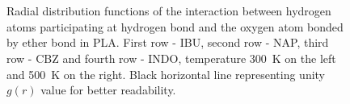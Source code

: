 \begin{figure}[H]
	\\
	\vspace{-0.2cm}
	\\
	\vspace{-0.2cm}
	\caption{Radial distribution functions of the interaction between hydrogen atoms participating at hydrogen bond and the oxygen atom bonded by ether bond in PLA. First row - IBU, second row - NAP, third row - CBZ and fourth row - INDO, temperature 300~K on the left and 500~K on the right. Black horizontal line representing unity $g(r)$ value for better readability.}
	\label{fig:ether}
\end{figure}


